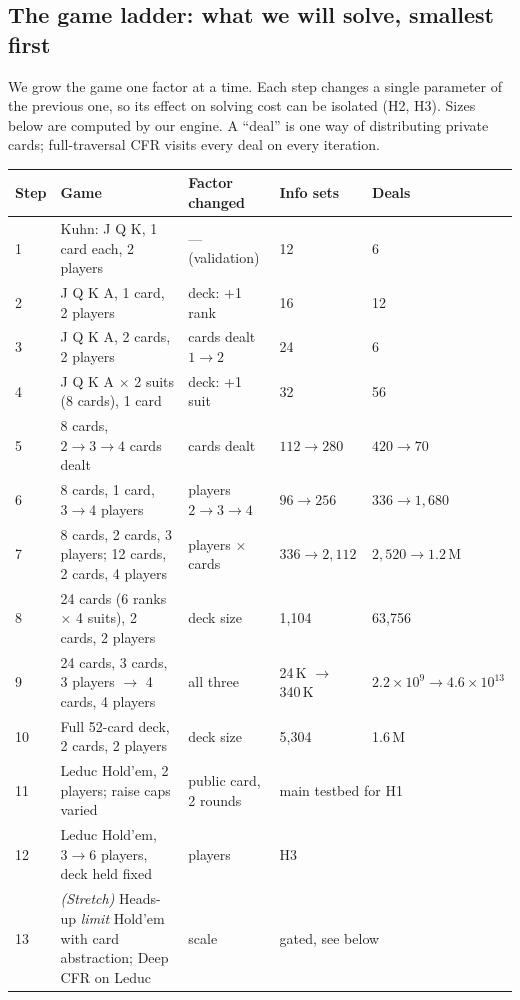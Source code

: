 \documentclass[10pt,a4paper]{article}
\begin{document}
\subsection{The game ladder: what we will solve, smallest first}
We grow the game one factor at a time. Each step changes a single parameter of the previous one, so its effect on solving cost can be isolated (H2, H3). Sizes below are computed by our engine. A ``deal'' is one way of distributing private cards; full-traversal CFR visits every deal on every iteration.

\begin{center}\small
\begin{tabularx}{\textwidth}{|l|X|l|l|l|}
\hline
\rowcolor{gray!15}\textbf{Step} & \textbf{Game} & \textbf{Factor changed} & \textbf{Info sets} & \textbf{Deals} \\ \hline
1 & Kuhn: J Q K, 1 card each, 2 players & --- (validation) & 12 & 6 \\ \hline
2 & J Q K A, 1 card, 2 players & deck: +1 rank & 16 & 12 \\ \hline
3 & J Q K A, 2 cards, 2 players & cards dealt $1\to2$ & 24 & 6 \\ \hline
4 & J Q K A $\times$ 2 suits (8 cards), 1 card & deck: +1 suit & 32 & 56 \\ \hline
5 & 8 cards, $2\to3\to4$ cards dealt & cards dealt & $112\to280$ & $420\to70$ \\ \hline
6 & 8 cards, 1 card, $3\to4$ players & players $2\to3\to4$ & $96\to256$ & $336\to1{,}680$ \\ \hline
7 & 8 cards, 2 cards, 3 players; 12 cards, 2 cards, 4 players & players $\times$ cards & $336\to2{,}112$ & $2{,}520\to1.2$\,M \\ \hline
8 & 24 cards (6 ranks $\times$ 4 suits), 2 cards, 2 players & deck size & 1,104 & 63,756 \\ \hline
9 & 24 cards, 3 cards, 3 players $\to$ 4 cards, 4 players & all three & 24\,K $\to$ 340\,K & $2.2{\times}10^{9} \to 4.6{\times}10^{13}$ \\ \hline
10 & Full 52-card deck, 2 cards, 2 players & deck size & 5,304 & 1.6\,M \\ \hline
11 & Leduc Hold'em, 2 players; raise caps varied & public card, 2 rounds & \multicolumn{2}{l|}{main testbed for H1} \\ \hline
12 & Leduc Hold'em, $3\to6$ players, deck held fixed & players & \multicolumn{2}{l|}{H3} \\ \hline
13 & \textit{(Stretch)} Heads-up \emph{limit} Hold'em with card abstraction; Deep CFR on Leduc & scale & \multicolumn{2}{l|}{gated, see below} \\ \hline
\end{tabularx}
\end{center}
\end{document}
